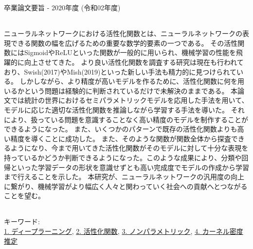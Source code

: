 卒業論文要旨 - 2020年度 (令和02年度)
\begin{center}
\begin{large}
\end{large}
\end{center}

~ \\



ニューラルネットワークにおける活性化関数とは、ニューラルネットワークの表現できる関数の幅を広げるための重要な数学的要素の一つである。
その活性関数にはSigmoidやReLUといった関数が一般的に用いられ、機械学習の性能を飛躍的に向上させてきた。
より良い活性化関数を調査する研究は現在も行われており、Swish(2017)やMish(2019)といった新しい手法も精力的に見つけられている。
しかしながら、より精度が高いモデルを作るために、活性化関数に何を用いるかという問題は経験的に判断されているだけで未解決のままである。
本論文では統計の世界におけるセミパラメトリックモデルを応用した手法を用いて、モデルに応じた適切な活性化関数を推論しながら学習する手法を導いた。
それにより、扱っている問題を意識することなく高い精度のモデルを制作することができるようになった。
また、いくつかのパターンで既存の活性化関数よりも高い精度を導くことに成功した。
また、そのような関数が関数全体から探査できるようになり、今まで用いてきた活性化関数がそのモデルに対して十分な表現を持っているかどうか判断できるようになった。このような成果により、分類や回帰といった学習データの形状を意識せずとも高い完成度でモデルの作成から学習まで行えることを示した。
本研究が、ニューラルネットワークの汎用度の向上に繋がり、機械学習がより幅広く人々と関わっていく社会への貢献へとつながることを望む。


~ \\
キーワード:\\
\underline{1. ディープラーニング},
\underline{2. 活性化関数},
\underline{3. ノンパラメトリック},
\underline{4. カーネル密度推定}
\begin{flushright}
\dept \\
\author
\end{flushright}
